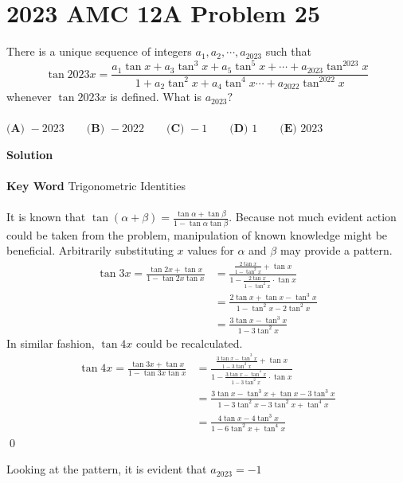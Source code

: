 \documentclass{article}
\newenvironment{solution}{\begin{trivlist}\item[]{\bf Solution}}{\qed \end{trivlist}}
\begin{document}
\section*{2023 AMC 12A Problem 25}
There is a unique sequence of integers $a_1,a_2,\cdots,a_{2023}$ such that
\[
\tan2023x=\frac{a_1\tan x+a_3\tan^3 x+a_5\tan^5x+\cdots+a_{2023}\tan^{2023}x}{1+a_2\tan^2x+a_4\tan^4x\cdots+a_{2022}\tan^{2022}x}
\]
whenever $\tan2023x$ is defined. What is $a_{2023}?$
\\\\
$\textbf{(A) } -2023 \qquad\textbf{(B) } -2022 \qquad\textbf{(C) } -1 \qquad\textbf{(D) } 1 \qquad\textbf{(E) } 2023$
\begin{solution}
\\\\
\textbf{Key Word} Trigonometric Identities
\\\\
It is known that $\tan(\alpha+\beta)=\frac{\tan\alpha+\tan\beta}{1-\tan\alpha\tan\beta}$. Because not much evident action could be taken from the problem, manipulation of known knowledge might be beneficial. Arbitrarily substituting $x$ values for $\alpha$ and $\beta$ may provide a pattern.
\begin{align*}
    \tan3x=\frac{\tan2x+\tan{x}}{1-\tan2x\tan{x}}&=\frac{\frac{2\tan{x}}{1-\tan^2x}+\tan{x}}{1-\frac{2\tan{x}}{1-\tan^2x}\cdot\tan{x}} \\
    &=\frac{2\tan{x}+\tan{x}-\tan^3x}{1-\tan^2x-2\tan^2x} \\
    &=\frac{3\tan{x}-\tan^3x}{1-3\tan^2x}
\end{align*}
In similar fashion, $\tan4x$ could be recalculated.
\begin{align*}
    \tan4x=\frac{\tan3x+\tan{x}}{1-\tan3x\tan{x}}&=\frac{\frac{3\tan{x}-\tan^3x}{1-3\tan^2x}+\tan{x}}{1-\frac{3\tan{x}-\tan^3x}{1-3\tan^2x}\cdot\tan{x}} \\
    &=\frac{3\tan{x}-\tan^3x+\tan{x}-3\tan^3x}{1-3\tan^2x-3\tan^2x+\tan^4x} \\
    &=\frac{4\tan{x}-4\tan^3x}{1-6\tan^2x+\tan^4x}
\end{align*}
\end{solution}
Looking at the pattern, it is evident that $a_{2023}=\boxed{-1}$
\end{document}
